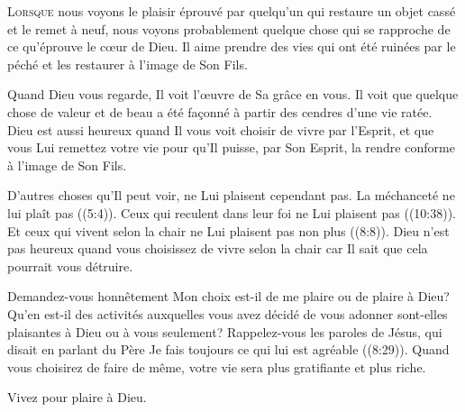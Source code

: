 



\lettrine{L}{orsque} nous voyons le plaisir éprouvé par quelqu'un
 qui restaure un objet cassé et le remet à neuf,
 nous voyons probablement quelque chose qui se rapproche de ce
 qu'éprouve le c\oe{}ur de Dieu.
 Il aime prendre des vies qui ont été ruinées par le péché
 et les restaurer à l'image de Son Fils. 

Quand Dieu vous regarde, Il voit l'\oe{}uvre de Sa grâce en vous.
 Il voit que quelque chose de valeur et de beau
 a été façonné à partir des cendres d'une vie ratée.
 Dieu est aussi heureux quand Il vous voit choisir de vivre par l'Esprit,
 et que vous Lui remettez votre vie pour qu'Il puisse, par Son Esprit,
 la rendre conforme à l'image de Son Fils. 


D'autres choses qu'Il peut voir, ne Lui plaisent cependant pas.
 La méchanceté ne lui plaît pas ((5:4)).
 Ceux qui reculent dans leur foi ne Lui plaisent pas ((10:38)).
 Et ceux qui vivent selon la chair ne Lui plaisent pas non plus
 ((8:8)).
 Dieu n'est pas heureux quand vous choisissez de vivre selon la chair
 car Il sait que cela pourrait vous détruire. 

Demandez-vous honnêtement\frcolon{}
 Mon choix est-il de me plaire ou de plaire à Dieu?
 Qu'en est-il des activités auxquelles vous avez décidé de vous adonner\frcolon{}
 sont-elles plaisantes à Dieu ou à vous seulement?
 Rappelez-vous les paroles de Jésus, qui disait en parlant du Père\frcolon{}
 \Og Je fais toujours ce qui lui est agréable \Fg{} ((8:29)).
 Quand vous choisirez de faire de même,
 votre vie sera plus gratifiante et plus riche. 

Vivez pour plaire à Dieu. 

\dvrule




